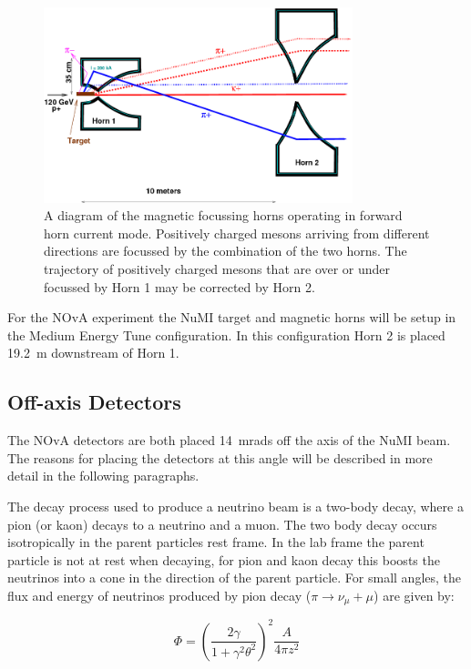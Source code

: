 \begin{figure}
  \centering
  \includegraphics[width=0.8\textwidth]{../../img/beam/images_pion_tracks_in_horn.png}  
  \caption{
    A diagram of the magnetic focussing horns operating in forward
    horn current 
    mode. Positively charged mesons arriving from different directions
    are focussed by the combination of the two horns. The trajectory of
    positively charged mesons that are over or under focussed by Horn
    1 may be corrected by Horn 2. \cite{NuMI}
  }
  \label{fig:horn}
\end{figure}


For the NOvA experiment the NuMI target and magnetic horns will be
setup in the Medium Energy Tune configuration. In this configuration
Horn 2 is placed 19.2~m downstream of Horn 1.


\subsection{Off-axis Detectors}

The NOvA detectors are both placed 14~mrads off the axis of the NuMI
beam.
The reasons for placing the detectors at this angle will be described
in more detail in the following paragraphs. 

The decay process used to produce a neutrino beam is a two-body decay,
where a
pion (or kaon) decays to a neutrino and a muon. The two body decay 
occurs isotropically in the parent particles rest frame. 
In the lab frame the parent particle is not at rest when decaying, for
pion and kaon decay this boosts the neutrinos into a cone in the
direction of the parent particle.
For small angles, the flux and energy of neutrinos produced by pion
decay ($\pi \rightarrow \nu_{\mu} + \mu$) are given by:

\begin{equation}
\Phi = \left( \dfrac{2\gamma}{1+\gamma^2 \theta^2} \right)^2 \dfrac{A}{4\pi z^2}
\label{eqn:NuPiFlux}
\end{equation}

